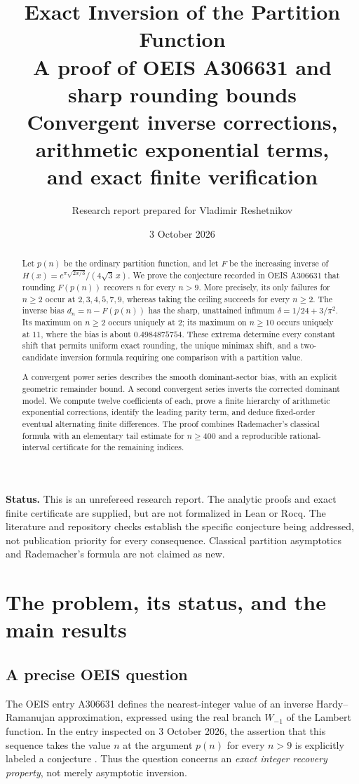 \documentclass[11pt]{article}
\title{\textbf{Exact Inversion of the Partition Function}\\[0.4em]
\large A proof of OEIS A306631 and sharp rounding bounds\\[0.4em]
\normalsize Convergent inverse corrections, arithmetic exponential terms,\\and exact finite verification}
\author{Research report prepared for Vladimir Reshetnikov}
\date{3 October 2026}
\numberwithin{equation}{section}
\theoremstyle{definition}
\theoremstyle{remark}
\begin{document}
\maketitle
\thispagestyle{empty}
\begin{abstract}
Let $p(n)$ be the ordinary partition function, and let $F$ be the increasing
inverse of $H(x)=e^{\pi\sqrt{2x/3}}/(4\sqrt3\,x)$. We prove the conjecture
recorded in OEIS A306631 that rounding $F(p(n))$ recovers $n$ for every
$n>9$. More precisely, its only failures for $n\ge2$ occur at
$2,3,4,5,7,9$, whereas taking the ceiling succeeds for every $n\ge2$.
The inverse bias $d_n=n-F(p(n))$ has the sharp, unattained infimum
$\delta=1/24+3/\pi^2$. Its maximum on $n\ge2$ occurs uniquely at $2$;
its maximum on $n\ge10$ occurs uniquely at $11$, where the bias is about
$0.4984875754$. These extrema determine every constant shift that permits
uniform exact rounding, the unique minimax shift, and a two-candidate
inversion formula requiring one comparison with a partition value.

A convergent power series describes the smooth dominant-sector bias, with
an explicit geometric remainder bound. A second convergent series inverts
the corrected dominant model. We compute twelve coefficients of each,
prove a finite hierarchy of arithmetic exponential corrections, identify
the leading parity term, and deduce fixed-order eventual alternating
finite differences. The proof combines Rademacher's classical formula
with an elementary tail estimate for $n\ge400$ and a reproducible
rational-interval certificate for the remaining indices.
\end{abstract}
\vfill
\noindent\textbf{Status.} This is an unrefereed research report. The analytic
proofs and exact finite certificate are supplied, but are not formalized
in Lean or Rocq. The literature and repository checks establish the
specific conjecture being addressed, not publication priority for every
consequence. Classical partition asymptotics and Rademacher's formula are
not claimed as new.
\newpage
{\small\setlength{\parskip}{0pt}\tableofcontents}
\newpage

\section{The problem, its status, and the main results}
\subsection{A precise OEIS question}
The OEIS entry A306631 defines the nearest-integer value of an inverse
Hardy--Ramanujan approximation, expressed using the real branch
$W_{-1}$ of the Lambert function. In the entry inspected on 3 October
2026, the assertion that this sequence takes the value $n$ at the argument
$p(n)$ for every $n>9$ is explicitly labeled a conjecture
\cite{oeis306631}. Thus the question concerns an \emph{exact integer
recovery property}, not merely asymptotic inversion.
\end{document}
